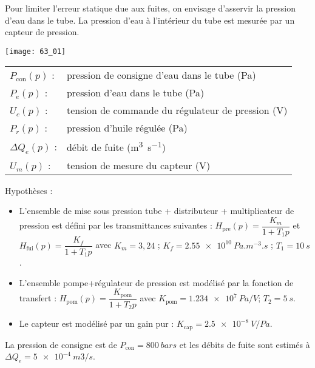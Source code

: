 \normaltrue \difficilefalse \tdifficilefalse
\correctiontrue

\setcounter{question}{0}

\ifcorrection
\else
{}
\fi

\ifprof
\else 

Pour limiter l’erreur statique due aux fuites, on envisage d’asservir la pression d’eau dans le tube. 
La pression d’eau à l’intérieur du tube est mesurée par un capteur de pression. 

\begin{center}
\texttt{[image: 63\_01]}
\end{center}

 
 \begin{tabular}{lp{5cm}}
$P_{\text{con}}(p)$ : & 	pression de consigne d’eau dans le tube (Pa) \\
$P_e(p)$ : & 	pression d’eau dans le tube (Pa) \\
$U_c(p)$ : & 	tension de commande du régulateur de pression (V)\\
$P_r(p)$ : &	pression d’huile régulée (Pa)\\
$\Delta Q_e(p)$ :& 	débit de fuite (\si{m^3s^{-1}})\\
$U_m(p)$ 	:&	tension de mesure du capteur (V)\\
\end{tabular}
 
 Hypothèses :
\begin{itemize}
\item L’ensemble de mise sous pression {tube + distributeur + multiplicateur de pression} est défini par les transmittances suivantes : $H_{\text{pre}} (p)=\dfrac{K_m}{1+T_1 p}$	et	$H_{\text{fui}} (p)=\dfrac{K_f}{1+T_1 p}$ avec 	$K_m = 3,24$ ; 	$K_f = \SI{2,55e10}{Pa.m^{-3}.s}$ ; 	$T_1  = \SI{10}{s}$.
\item L’ensemble {pompe+régulateur de pression} est modélisé par la fonction de transfert :
$H_{\text{pom}} (p)=\dfrac{K_{\text{pom}}}{1+T_2 p}$  avec 	$K_{\text{pom}} = \SI{1,234e7}{Pa/V}$; 	$T_2 = \SI{5}{s}$.
\item Le capteur est modélisé par un gain pur :	$K_{\text{cap}} = \SI{2,5e-8}{V/Pa}$.
\end{itemize}
La pression de consigne est de $P_{\text{con}} = \SI{800}{bars}$ et les débits de fuite sont estimés à $\Delta Q_e = \SI{5e-4}{m3/s}$.

